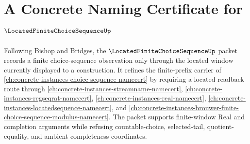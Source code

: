 \chapter{A Concrete Naming Certificate for $\LocatedFiniteChoiceSequenceUp$}
\label{ch:concrete-instances-located-finite-choice-sequence-namecert}

Following Bishop and Bridges, the $\LocatedFiniteChoiceSequenceUp$ packet records a finite choice-sequence observation only through the located window currently displayed to a construction. It refines the finite-prefix carrier of \autoref{ch:concrete-instances-choice-sequence-namecert} by requiring a located readback route through \autoref{ch:concrete-instances-streamname-namecert}, \autoref{ch:concrete-instances-regseqrat-namecert}, \autoref{ch:concrete-instances-real-namecert}, \autoref{ch:concrete-instances-locatedsequence-namecert}, and \autoref{ch:concrete-instances-brouwer-finite-choice-sequence-modulus-namecert}. The packet supports finite-window Real and completion arguments while refusing countable-choice, selected-tail, quotient-equality, and ambient-completeness coordinates.

